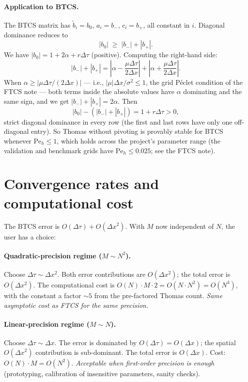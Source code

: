 \documentclass[11pt,a4paper]{article}
\begin{document}
\paragraph{Application to BTCS.} The BTCS matrix has $\tilde b_i =
b_0$, $a_i = b_-$, $c_i = b_+$, all constant in $i$. Diagonal
dominance reduces to
\[
|b_0| \;\ge\; |b_-| + |b_+|.
\]
We have $|b_0| = 1 + 2\alpha + r\Delta\tau$ (positive). Computing the
right-hand side:
\[
|b_-| + |b_+|
= \left|\alpha - \frac{\mu\Delta\tau}{2\Delta x}\right|
 + \left|\alpha + \frac{\mu\Delta\tau}{2\Delta x}\right|.
\]
When $\alpha \ge \bigl|\mu\Delta\tau/(2\Delta x)\bigr|$ — i.e.,
$\bigl|\mu\bigr|\Delta x/\sigma^2 \le 1$, the grid Péclet condition
of the FTCS note — both terms inside the absolute values have $\alpha$
dominating and the same sign, and we get
$|b_-| + |b_+| = 2\alpha$. Then
\[
|b_0| - (|b_-| + |b_+|) = 1 + r\Delta\tau > 0,
\]
strict diagonal dominance in every row (the first and last rows have
only one off-diagonal entry). So Thomas without pivoting is provably
stable for BTCS whenever $\mathrm{Pe}_h \le 1$, which holds across the
project's parameter range (the validation and benchmark grids have
$\mathrm{Pe}_h \le 0.025$; see the FTCS note).

\section{Convergence rates and computational cost}

The BTCS error is $O(\Delta\tau) + O(\Delta x^2)$. With $M$ now
independent of $N$, the user has a choice:

\paragraph{Quadratic-precision regime ($M \sim N^2$).} Choose
$\Delta\tau \sim \Delta x^2$. Both error contributions are
$O(\Delta x^2)$; the total error is $O(\Delta x^2)$. The
computational cost is $O(N) \cdot M \cdot 2 = O(N \cdot N^2) =
O(N^3)$, with the constant a factor $\sim 5$ from the pre-factored
Thomas count.
\emph{Same asymptotic cost as FTCS for the same precision.}

\paragraph{Linear-precision regime ($M \sim N$).} Choose
$\Delta\tau \sim \Delta x$. The error is dominated by $O(\Delta\tau)
= O(\Delta x)$; the spatial $O(\Delta x^2)$ contribution is
sub-dominant. The total error is $O(\Delta x)$. Cost: $O(N) \cdot
M = O(N^2)$. \emph{Acceptable when first-order precision is enough}
(prototyping, calibration of insensitive parameters, sanity checks).
\end{document}
